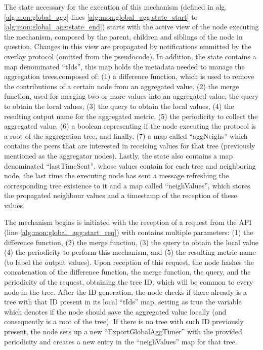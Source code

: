 The state necessary for the execution of this mechanism (defined in alg. \ref{alg:mon:global_agg} lines \ref{alg:mon:global_agg:state_start} to \ref{alg:mon:global_agg:state_end}) starts with the active view of the node executing the mechanism, composed by the parent, children and siblings of the node in question. Changes in this view are propagated by notifications emmitted by the overlay protocol (omitted from the pseudocode). In addition, the state contains a map denominated ``tIds'',  this map holds the metadata needed to manage the aggregation trees,composed of: (1) a difference function, which is used to remove the contributions of a certain node from an aggregated value, (2) the merge function, used for merging two or more values into an aggregated value, the query to obtain the local values, (3) the query to obtain the local values, (4) the resulting output name for the aggregated metric, (5) the periodicity to collect the aggregated value, (6) a boolean representing if the node executing the protocol is a root of the aggregation tree, and finally, (7) a map called ``aggNeighs'' which contains the peers that are interested in receicing values for that tree (previously mentioned as the aggregator nodes). Lastly, the state also contains a map denominated ``lastTimeSent'', whose values contain for each tree and neighboring node, the last time the executing node has sent a message refreshing the corresponding tree existence to it and a map called ``neighValues'', which stores the propagated neighbour values and a timestamp of the reception of these values. 

The mechanism begins is initiated with the reception of a request from the API (line \ref{alg:mon:global_agg:start_req}) with contains multiple parameters: (1) the difference function, (2) the merge function,  (3) the query to obtain the local value (4) the periodicity to perform this mechanism, and (5) the resulting metric name (to label the output values). Upon reception of this request, the node hashes the concatenation of the difference function, the merge function, the query, and the periodicity of the request, obtaining the tree ID, which will be common to every node in the tree. After the ID generation, the node checks if there already is a tree with that ID present in its local ``tIds'' map, setting as true the variable which denotes if the node should save the aggregated value locally (and consequently is a root of the tree). If there is no tree with such ID previously present, the node sets up a new ``ExportGlobalAggTimer'' with the provided periodicity and creates a new entry in the ``neighValues'' map for that tree.

